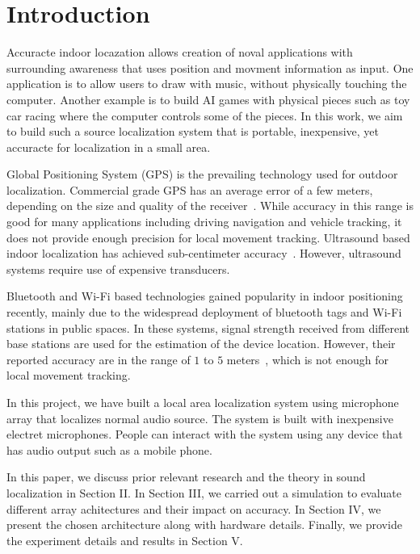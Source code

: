 \section{Introduction}


Accuracte indoor locazation allows creation of noval applications with surrounding awareness that uses position and movment information as input. One application is to allow users to draw with music, without physically touching the computer. Another example is to build AI games with physical pieces such as toy car racing where the computer controls some of the pieces. In this work, we aim to build such a source localization system that is portable, inexpensive, yet accuracte for localization in a small area. 

Global Positioning System (GPS) is the prevailing technology used for outdoor localization. Commercial grade GPS has an average error of a few meters, depending on the size and quality of the receiver~\cite{intro:gps}. While accuracy in this range is good for many applications including driving navigation and vehicle tracking, it does not provide enough precision for local movement tracking. Ultrasound based indoor localization has achieved sub-centimeter accuracy~\cite{intro:ultra}. However, ultrasound systems require use of expensive transducers.

Bluetooth and Wi-Fi based technologies gained popularity in indoor positioning recently, mainly due to the widespread deployment of bluetooth tags and Wi-Fi stations in public spaces. In these systems, signal strength received from different base stations are used for the estimation of the device location. However, their reported accuracy are in the range of $1$ to $5$ meters~\cite{intro:blue, intro:loc}, which is not enough for local movement tracking.

In this project, we have built a local area localization system using microphone array that localizes normal audio source. The system is built with inexpensive electret microphones. People can interact with the system using any device that has audio output such as a mobile phone.

In this paper, we discuss prior relevant research and the theory in sound localization in Section II. In Section III, we carried out a simulation to evaluate different array achitectures and their impact on accuracy. In Section IV, we present the chosen architecture along with hardware details. Finally, we provide the experiment details and results in Section V.
